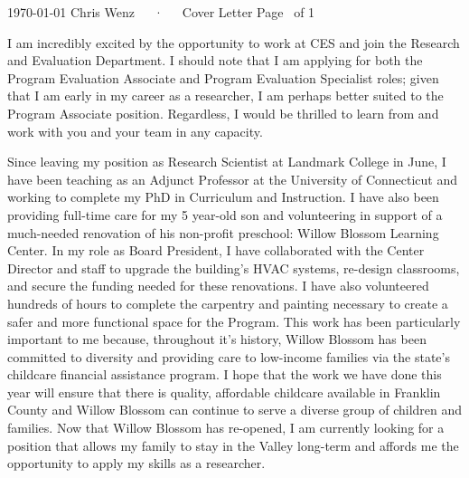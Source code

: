 \documentclass[11pt, a4paper]{awesome-cv}
\begin{document}
\makecvheader[C]

\makecvfooter
  {\today}
  {Chris Wenz~~~·~~~Cover Letter}
  {Page \thepage\ of 1}
\makelettertitle

\begin{cvletter}

I am incredibly excited by the opportunity to work at CES and join the Research and Evaluation Department. I should note that I am applying for both the Program Evaluation Associate and Program Evaluation Specialist roles; given that I am early in my career as a researcher, I am perhaps better suited to the Program Associate position. Regardless, I would be thrilled to learn from and work with you and your team in any capacity.

Since leaving my position as Research Scientist at Landmark College in June, I have been teaching as an Adjunct Professor at the University of Connecticut and working to complete my PhD in Curriculum and Instruction. I have also been providing full-time care for my 5 year-old son and volunteering in support of a much-needed renovation of his non-profit preschool: Willow Blossom Learning Center. In my role as Board President, I have collaborated with the Center Director and staff to upgrade the building's HVAC systems, re-design classrooms, and secure the funding needed for these renovations. I have also volunteered hundreds of hours to complete the carpentry and painting necessary to create a safer and more functional space for the Program. This work has been particularly important to me because, throughout it's history, Willow Blossom has been committed to diversity and providing care to low-income families via the state's childcare financial assistance program. I hope that the work we have done this year will ensure that there is quality, affordable childcare available in Franklin County and Willow Blossom can continue to serve a diverse group of children and families. Now that Willow Blossom has re-opened, I am currently looking for a position that allows my family to stay in the Valley long-term and affords me the opportunity to apply my skills as a researcher. 


\end{cvletter}
\end{document}
